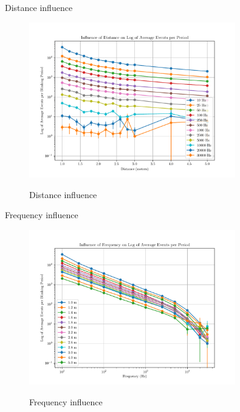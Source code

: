 \documentclass{beamer}
\begin{document}
\begin{frame}{Distance influence}

\begin{figure}[H]
    \centering
    \includegraphics[width=0.8\textwidth]{../fig/semestral/distlog.pdf}
    \label{fig:dist_influence}
    \caption{Distance influence}
\end{figure}

\end{frame}

\begin{frame}{Frequency influence}

\begin{figure}[H]
    \centering
    \includegraphics[width=0.8\textwidth]{../fig/semestral/freqlog.pdf}
    \label{fig:freq_influence}
    \caption{Frequency influence}
\end{figure}

\end{frame}
\end{document}
